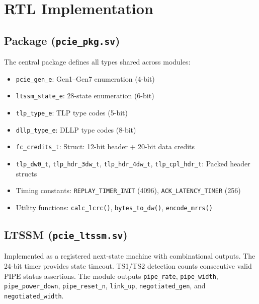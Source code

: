 \documentclass[12pt,a4paper]{report}
\begin{document}
\chapter{RTL Implementation}\label{ch:rtl}

\section{Package (\texttt{pcie\_pkg.sv})}

The central package defines all types shared across modules:

\begin{itemize}[noitemsep]
  \item \texttt{pcie\_gen\_e}: Gen1--Gen7 enumeration (4-bit)
  \item \texttt{ltssm\_state\_e}: 28-state enumeration (6-bit)
  \item \texttt{tlp\_type\_e}: TLP type codes (5-bit)
  \item \texttt{dllp\_type\_e}: DLLP type codes (8-bit)
  \item \texttt{fc\_credits\_t}: Struct: 12-bit header + 20-bit data credits
  \item \texttt{tlp\_dw0\_t}, \texttt{tlp\_hdr\_3dw\_t}, \texttt{tlp\_hdr\_4dw\_t},
        \texttt{tlp\_cpl\_hdr\_t}: Packed header structs
  \item Timing constants: \texttt{REPLAY\_TIMER\_INIT} (4096), \texttt{ACK\_LATENCY\_TIMER} (256)
  \item Utility functions: \texttt{calc\_lcrc()}, \texttt{bytes\_to\_dw()}, \texttt{encode\_mrrs()}
\end{itemize}

\section{LTSSM (\texttt{pcie\_ltssm.sv})}

Implemented as a registered next-state machine with combinational outputs.
The 24-bit timer provides state timeout. TS1/TS2 detection counts consecutive
valid PIPE status assertions. The module outputs \texttt{pipe\_rate},
\texttt{pipe\_width}, \texttt{pipe\_power\_down}, \texttt{pipe\_reset\_n},
\texttt{link\_up}, \texttt{negotiated\_gen}, and \texttt{negotiated\_width}.
\end{document}
